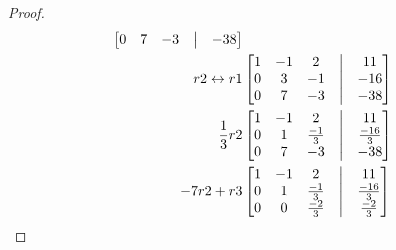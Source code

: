 \documentclass[12pt]{article}
\begin{document}
\begin{enumerate}
\begin{enumerate}
\begin{proof}
\begin{align*}
\begin{bmatrix}
                                                    0 & 7  & -3 & \bigm| & -38 \\
                                            \end{bmatrix} \\
                                            r2\leftrightarrow r1
                                             &
                                            \begin{bmatrix}
                                                    1 & -1 & 2  & \bigm| & 11  \\
                                                    0 & 3  & -1 & \bigm| & -16 \\
                                                    0 & 7  & -3 & \bigm| & -38 \\
                                            \end{bmatrix} \\
                                            \frac{1}{3}r2
                                             &
                                            \begin{bmatrix}
                                                    1 & -1 & 2            & \bigm| & 11            \\
                                                    0 & 1  & \frac{-1}{3} & \bigm| & \frac{-16}{3} \\
                                                    0 & 7  & -3           & \bigm| & -38           \\
                                            \end{bmatrix} \\
                                            -7r2+r3
                                             &
                                            \begin{bmatrix}
                                                    1 & -1 & 2            & \bigm| & 11            \\
                                                    0 & 1  & \frac{-1}{3} & \bigm| & \frac{-16}{3} \\
                                                    0 & 0  & \frac{-2}{3} & \bigm| & \frac{-2}{3}  \\
                                            \end{bmatrix} \\
                                    \end{align*}

\end{proof}
\end{enumerate}
\end{enumerate}
\end{document}
